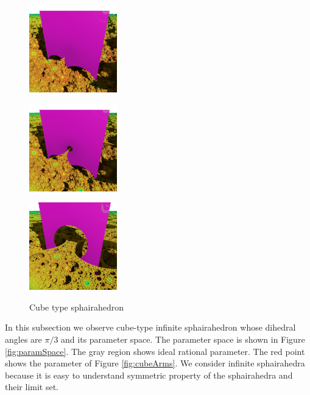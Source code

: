\documentclass[suppldata, dvipdfmx]{interact}
\theoremstyle{plain}%
\theoremstyle{definition}
\theoremstyle{remark}
\theoremstyle{problemstyle}
\begin{document}
\begin{figure}[H]
 \begin{minipage}[t]{0.3\textwidth}
  \centering
  \includegraphics[width=1.5in, keepaspectratio]{./img/visualization/cubePrism.png}
  \subcaption{}
  \label{fig:upperPrism}
 \end{minipage}
 \hspace*{\fill}
 \begin{minipage}[t]{0.3\textwidth}
  \centering
  \includegraphics[width=1.5in, keepaspectratio]{./img/visualization/cubeSmallHole.png}
  \subcaption{}
  \label{fig:upperPrismSmallHole}
  \end{minipage}
 \hspace*{\fill}
 \begin{minipage}[t]{0.3\textwidth}
  \centering
  \includegraphics[width=1.5in, keepaspectratio]{./img/visualization/cubeHole.png}
  \subcaption{}
  \label{fig:upperPrismBigHole}
 \end{minipage}
 \hspace*{\fill}
 \caption{Cube type sphairahedron}
 \label{fig:cubeHole}
\end{figure}

In this subsection we observe cube-type infinite sphairahedron whose
dihedral angles are $\pi / 3$ and its parameter space.
The parameter space is shown in Figure \ref{fig:paramSpace}.%
The gray region shows ideal rational parameter. The red point shows the
parameter of Figure \ref{fig:cubeArms}.
We consider infinite sphairahedra because it is easy to understand
symmetric property of the sphairahedra and their limit set.
\end{document}
